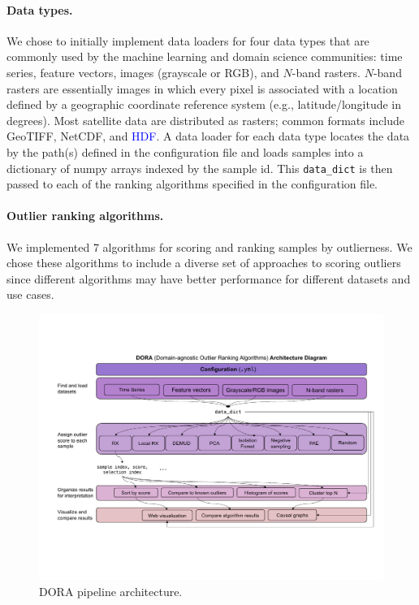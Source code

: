 \documentclass[letterpaper]{article} %
\newcommand{\todo}[1]{\textcolor{blue}{#1}}
\begin{document}
\paragraph{Data types.} We chose to initially implement data loaders for four
data types that are commonly used by the machine learning and domain science
communities: time series, feature vectors, images (grayscale or RGB), and 
$N$-band rasters. $N$-band rasters are essentially images in which every pixel
is associated with a location defined by a geographic coordinate reference 
system (e.g., latitude/longitude in degrees). Most satellite data are 
distributed as rasters; common formats include GeoTIFF, NetCDF, and 
\todo{HDF}. A data loader for each data type locates the data by the path(s)
defined in the configuration file and loads samples into a dictionary of numpy
 arrays indexed by the sample id. This \texttt{data\_dict} is then passed to each of the ranking algorithms specified in 
 the configuration file.

\paragraph{Outlier ranking algorithms.} We implemented 7 algorithms for 
scoring and 
ranking samples by outlierness. We chose these algorithms to include a diverse
set of approaches to scoring outliers since different algorithms may have 
better performance for different datasets and use cases. 

\begin{figure}
    \centering
    \includegraphics[width=\linewidth]{figures/dora-system-diagram-v5.pdf}
    \caption{DORA pipeline architecture.}
    \label{fig:dora}
\end{figure}
\end{document}
